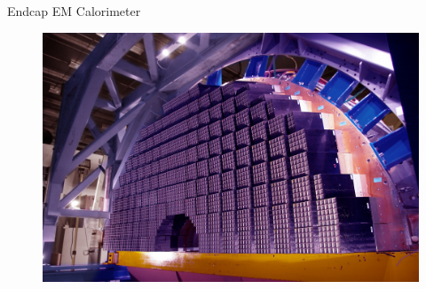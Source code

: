 \documentclass[10pt]{beamer}
\begin{document}
\begin{frame}{Endcap EM Calorimeter}
    \begin{figure}
        \centering
        \includegraphics[width=\textwidth]{./img/ecal_endcap_photo.jpg}
    \end{figure}
\end{frame}
\end{document}
